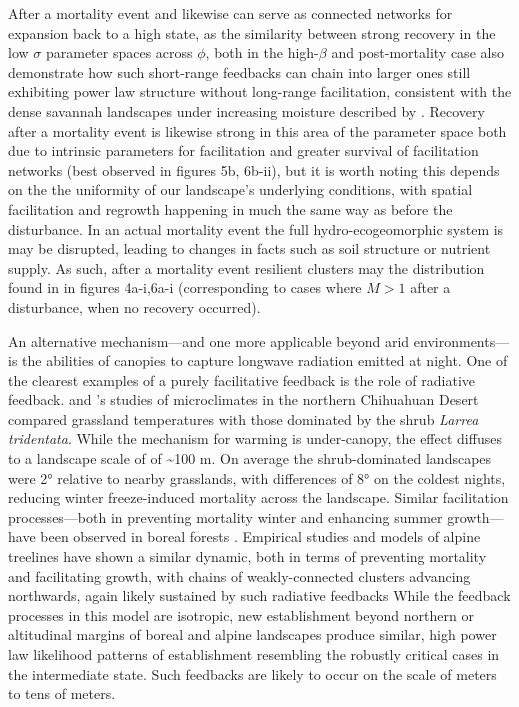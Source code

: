 \documentclass[10pt]{article}
\begin{document}
\begin{linenumbers}
After a mortality event and likewise can serve as connected networks for expansion back to a high state, as the similarity between strong recovery in the low $\sigma$ parameter spaces across $\phi$, both in the high-$\beta$ and post-mortality case also demonstrate how such short-range feedbacks can chain into larger ones still exhibiting power law structure without long-range facilitation, consistent with the dense savannah landscapes under increasing moisture described by \citet{Scanlon2007}. Recovery after a mortality event is likewise strong in this area of the parameter space both due to intrinsic parameters for facilitation and greater survival of facilitation networks (best observed in figures 5b, 6b-ii), but it is worth noting this depends on the the uniformity of our landscape's underlying conditions, with spatial facilitation and regrowth happening in much the same way as before the disturbance. In an actual mortality event the full hydro-ecogeomorphic system is may be disrupted, leading to changes in facts such as soil structure or nutrient supply. As such, after a mortality event resilient clusters may the distribution found in in figures 4a-i,6a-i (corresponding to cases where $M > 1$ after a disturbance, when no recovery occurred).

An alternative mechanism---and one more applicable beyond arid environments---is the abilities of canopies to capture longwave radiation emitted at night. One of the clearest examples of a purely facilitative feedback is the role of radiative feedback. \citet{He2010} and \citet{DOdorico2010}'s studies of microclimates in the northern Chihuahuan Desert compared grassland temperatures with those dominated by the shrub \textit{Larrea tridentata}. While the mechanism for warming is under-canopy, the effect diffuses to a landscape scale of of \textasciitilde100 m. On average the shrub-dominated landscapes were 2° relative to nearby grasslands, with differences of 8° on the coldest nights, reducing winter freeze-induced mortality across the landscape. Similar facilitation processes---both in preventing mortality winter and enhancing summer growth---have been observed in boreal forests \citep{MacDonald2008}. Empirical studies and models of alpine treelines have shown a similar dynamic, both in terms of preventing mortality and facilitating growth, with chains of weakly-connected clusters advancing northwards, again likely sustained by such radiative feedbacks \citep{ZengMalanson2005,Resler2009} While the feedback processes in this model are isotropic, new establishment beyond northern or altitudinal margins of boreal and alpine landscapes produce similar, high power law likelihood patterns of establishment resembling the robustly critical cases in the intermediate state. Such feedbacks are likely to occur on the scale of meters to tens of meters.


\end{linenumbers}
\end{document}
